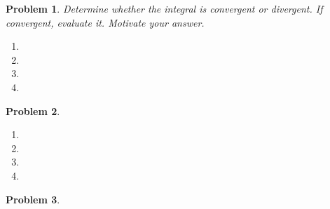 \documentclass{article}
\renewcommand{\fcProblemRef}{\theproblem.\theenumi}
\newtheorem{problem}{Problem}
\begin{document}
\begin{problem} Determine whether the integral is convergent or divergent. If convergent, evaluate it. Motivate your answer.

\begin{multicols}{2}
\begin{enumerate}[ref={\fcProblemRef}]
\item 
\item 
\item 
\item 
\end{enumerate}
\end{multicols}
\end{problem}

\begin{problem}
\begin{enumerate}[ref={\fcProblemRef}]
\item 
\item 
\item 
\item 
\end{enumerate}
\end{problem}



\begin{problem}


\end{problem}




%
%
\end{document}
